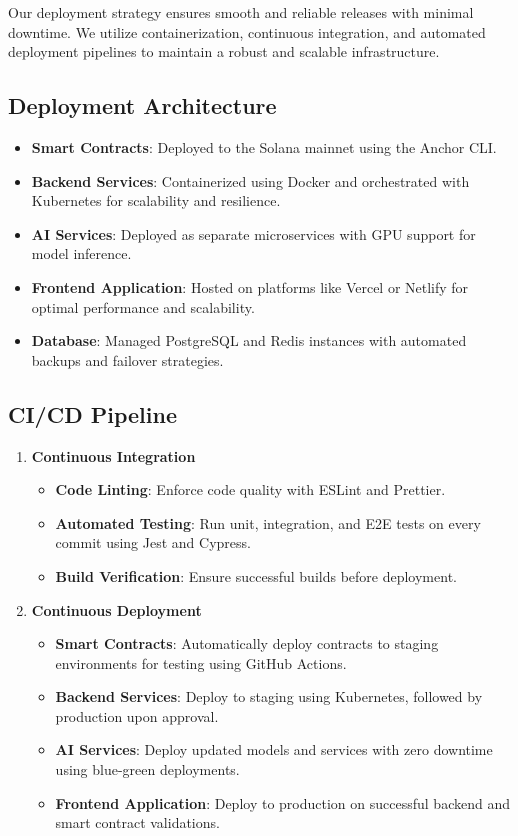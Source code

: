 \documentclass[11pt,a4paper]{article}
\begin{document}
Our deployment strategy ensures smooth and reliable releases with minimal downtime. We utilize containerization, continuous integration, and automated deployment pipelines to maintain a robust and scalable infrastructure.

\subsection{Deployment Architecture}

\begin{itemize}
    \item \textbf{Smart Contracts}: Deployed to the Solana mainnet using the Anchor CLI.
    \item \textbf{Backend Services}: Containerized using Docker and orchestrated with Kubernetes for scalability and resilience.
    \item \textbf{AI Services}: Deployed as separate microservices with GPU support for model inference.
    \item \textbf{Frontend Application}: Hosted on platforms like Vercel or Netlify for optimal performance and scalability.
    \item \textbf{Database}: Managed PostgreSQL and Redis instances with automated backups and failover strategies.
\end{itemize}

\subsection{CI/CD Pipeline}

\begin{enumerate}
    \item \textbf{Continuous Integration}
    \begin{itemize}
        \item \textbf{Code Linting}: Enforce code quality with ESLint and Prettier.
        \item \textbf{Automated Testing}: Run unit, integration, and E2E tests on every commit using Jest and Cypress.
        \item \textbf{Build Verification}: Ensure successful builds before deployment.
    \end{itemize}
    
    \item \textbf{Continuous Deployment}
    \begin{itemize}
        \item \textbf{Smart Contracts}: Automatically deploy contracts to staging environments for testing using GitHub Actions.
        \item \textbf{Backend Services}: Deploy to staging using Kubernetes, followed by production upon approval.
        \item \textbf{AI Services}: Deploy updated models and services with zero downtime using blue-green deployments.
        \item \textbf{Frontend Application}: Deploy to production on successful backend and smart contract validations.
    \end{itemize}
\end{enumerate}
\end{document}
